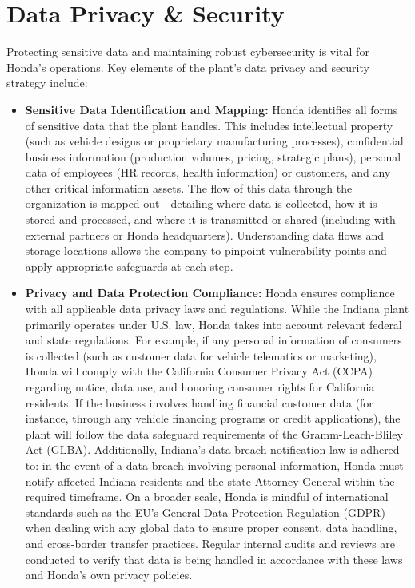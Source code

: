 \section{Data Privacy \& Security}
Protecting sensitive data and maintaining robust cybersecurity is vital for Honda’s operations. Key elements of the plant’s data privacy and security strategy include:
\begin{itemize}
    \item \textbf{Sensitive Data Identification and Mapping:} Honda identifies all forms of sensitive data that the plant handles. This includes intellectual property (such as vehicle designs or proprietary manufacturing processes), confidential business information (production volumes, pricing, strategic plans), personal data of employees (HR records, health information) or customers, and any other critical information assets. The flow of this data through the organization is mapped out---detailing where data is collected, how it is stored and processed, and where it is transmitted or shared (including with external partners or Honda headquarters). Understanding data flows and storage locations allows the company to pinpoint vulnerability points and apply appropriate safeguards at each step.
    \item \textbf{Privacy and Data Protection Compliance:} Honda ensures compliance with all applicable data privacy laws and regulations. While the Indiana plant primarily operates under U.S. law, Honda takes into account relevant federal and state regulations. For example, if any personal information of consumers is collected (such as customer data for vehicle telematics or marketing), Honda will comply with the California Consumer Privacy Act (CCPA) regarding notice, data use, and honoring consumer rights for California residents. If the business involves handling financial customer data (for instance, through any vehicle financing programs or credit applications), the plant will follow the data safeguard requirements of the Gramm-Leach-Bliley Act (GLBA). Additionally, Indiana’s data breach notification law is adhered to: in the event of a data breach involving personal information, Honda must notify affected Indiana residents and the state Attorney General within the required timeframe. On a broader scale, Honda is mindful of international standards such as the EU’s General Data Protection Regulation (GDPR) when dealing with any global data to ensure proper consent, data handling, and cross-border transfer practices. Regular internal audits and reviews are conducted to verify that data is being handled in accordance with these laws and Honda’s own privacy policies.

\end{itemize}
